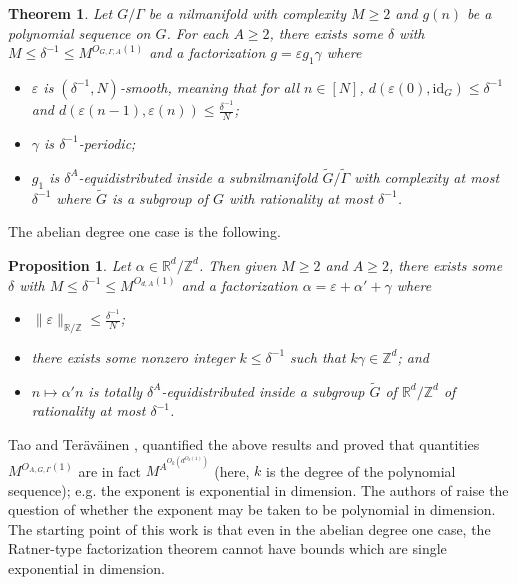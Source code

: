 \documentclass[11pt, a4paper]{amsart}
\theoremstyle{plain}
\theoremstyle{plain}
\newtheorem{theorem}{Theorem}
\newtheorem{proposition}{Proposition}
\theoremstyle{definition}
\theoremstyle{remark}
\numberwithin{equation}{section}
\numberwithin{lemma}{section}
\numberwithin{proposition}{section}
\numberwithin{corollary}{section}
\numberwithin{definition}{section}
\numberwithin{claim}{section}
\begin{document}
\begin{theorem}\label{t:RatnerFactorization}
Let $G/\Gamma$ be a nilmanifold with complexity $M \ge 2$ and $g(n)$ be a polynomial sequence on $G$. For each $A \ge 2$, there exists some $\delta$ with $M \le \delta^{-1} \le M^{O_{G, \Gamma, A}(1)}$ and a factorization $g = \varepsilon g_1 \gamma$ where
\begin{itemize}
    \item $\varepsilon$ is $(\delta^{-1}, N)$-smooth, meaning that for all $n \in [N]$, $d(\varepsilon(0), \mathrm{id}_G) \le \delta^{-1}$ and $d(\varepsilon(n - 1), \varepsilon(n)) \le \frac{\delta^{-1}}{N}$;
    \item $\gamma$ is $\delta^{-1}$-periodic;
    \item $g_1$ is $\delta^{A}$-equidistributed inside a subnilmanifold $\tilde{G}/\tilde{\Gamma}$ with complexity at most $\delta^{-1}$ where $\tilde{G}$ is a subgroup of $G$ with rationality at most $\delta^{-1}$. 
\end{itemize}
\end{theorem}
The abelian degree one case is the following.
\begin{proposition}\label{p:AbelianRatnerFactorization}
Let $\alpha \in \mathbb{R}^d/\mathbb{Z}^d$. Then given $M \ge 2$ and $A \ge 2$, there exists some $\delta$ with $M \le \delta^{-1} \le M^{O_{d, A}(1)}$ and a factorization $\alpha = \varepsilon + \alpha' + \gamma$ where
\begin{itemize}
    \item $\|\varepsilon\|_{\mathbb{R}/\mathbb{Z}} \le \frac{\delta^{-1}}{N}$;
    \item there exists some nonzero integer $k \le \delta^{-1}$ such that $k\gamma \in \mathbb{Z}^d$; and
    \item $n \mapsto \alpha'n$ is totally $\delta^{A}$-equidistributed inside a subgroup $\tilde{G}$ of $\mathbb{R}^d/\mathbb{Z}^d$ of rationality at most $\delta^{-1}$.
\end{itemize}
\end{proposition}
Tao and Ter{\"a}v{\"a}inen \cite{TT21}, quantified the above results and proved that quantities $M^{O_{A,G,\Gamma}(1)}$ are in fact $M^{A^{O_k(d^{O_k(1)})}}$ (here, $k$ is the degree of the polynomial sequence); e.g. the exponent is exponential in dimension. The authors of \cite{TT21} raise the question of whether the exponent may be taken to be polynomial in dimension. The starting point of this work is that even in the abelian degree one case, the Ratner-type factorization theorem cannot have bounds which are single exponential in dimension.
\end{document}

